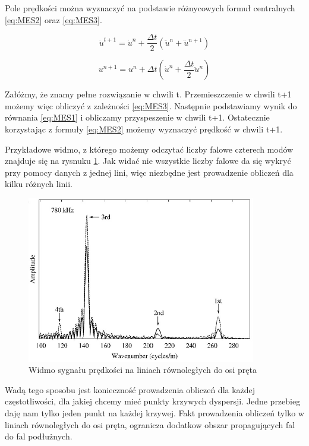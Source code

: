 Pole prędkości można wyznaczyć na podstawie różnycowych formuł centralnych \ref{eq:MES2} oraz \ref{eq:MES3}.

\begin{equation} \label{eq:MES2}
\dot u^{t+1} = \dot u^n + \frac{\Delta t}{2}(\ddot u^n + \ddot u^{n+1})
\end{equation}

\begin{equation} \label{eq:MES3}
u^{n+1} = u^n + \Delta t(\dot u^n + \frac{\Delta t}{2}\ddot u^n)
\end{equation}

Załóżmy, że znamy pełne rozwiązanie w chwili t. Przemieszczenie w chwili t+1 możemy więc obliczyć z zależności \ref{eq:MES3}. Następnie podstawiamy wynik do równania \ref{eq:MES1} i obliczamy przyspeszenie w chwili t+1. Ostatecznie korzystając z formuły \ref{eq:MES2} możemy wyznaczyć prędkość w chwili t+1.

Przykładowe widmo, z którego możemy odczytać liczby falowe czterech modów znajduje się na rysnuku \ref{fig:widmo_wymuszenie1}. Jak widać nie wszystkie liczby falowe da się wykryć przy pomocy danych z jednej lini, więc niezbędne jest prowadzenie obliczeń dla kilku różnych linii.

\begin{figure}[h]
\centering
\includegraphics[width=10cm]{Zdjecia/2/widmo_wymuszenia_waskopasmowe}
\caption{Widmo sygnału prędkości na liniach równoległych do osi pręta}
\label{fig:widmo_wymuszenie1}
\end{figure}

Wadą tego sposobu jest konieczność prowadzenia obliczeń dla każdej częstotliwości, dla jakiej chcemy mieć punkty krzywych dyspersji. Jedne przebieg daję nam tylko jeden punkt na każdej krzywej. Fakt prowadzenia obliczeń tylko w liniach równoległych do osi pręta, ogranicza dodatkow obszar propagujących fal do fal podłużnych.

